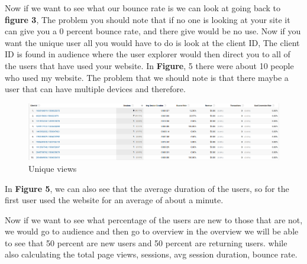 \documentclass{article}
\begin{document}
Now if we want to see what our bounce rate is we can look at going back to \textbf{figure 3}, The problem you should note that if no one is looking at your site it can give you a 0 percent bounce rate, and there give would be no use. Now if you want the unique user all you would have to do is look at the client ID, The client ID is found in audience where the user explorer would then direct you to all of the users that have used your website. In \textbf{Figure}, 5  there were about 10 people who used my website. The problem that we should note is that there maybe a user that can have  multiple devices and therefore. 

\begin{figure}[t]
\includegraphics[scale = .5]{unique.png}
\centering
\caption{Unique views}
\end{figure}

In \textbf{Figure 5}, we can also see that the average duration of the users, so for the first user used the website for an average of about a minute. 

Now if we want to see what percentage of the users are new to those that are not, we would go to audience and then go to overview in the overview we will be able to see that 50 percent are new users and 50 percent are returning users.  while also calculating the total page views, sessions, avg session duration, bounce rate. 
   
\end{document}
